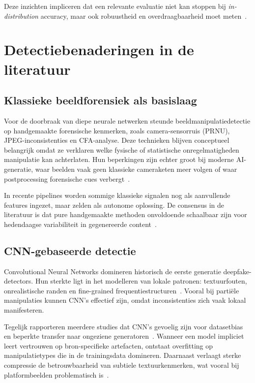 Deze inzichten impliceren dat een relevante evaluatie niet kan stoppen bij \emph{in-distribution} accuracy, maar ook robuustheid en overdraagbaarheid moet meten~\autocite{EvaluationModels2025,OpenSet2025}.

\section{Detectiebenaderingen in de literatuur}

\subsection{Klassieke beeldforensiek als basislaag}
Voor de doorbraak van diepe neurale netwerken steunde beeldmanipulatiedetectie op handgemaakte forensische kenmerken, zoals camera-sensorruis (PRNU), JPEG-inconsistenties en CFA-analyse. Deze technieken blijven conceptueel belangrijk omdat ze verklaren welke fysische of statistische onregelmatigheden manipulatie kan achterlaten. Hun beperkingen zijn echter groot bij moderne AI-generatie, waar beelden vaak geen klassieke cameraketen meer volgen of waar postprocessing forensische cues verbergt~\autocite{Pei2024}.

In recente pipelines worden sommige klassieke signalen nog als aanvullende features ingezet, maar zelden als autonome oplossing. De consensus in de literatuur is dat pure handgemaakte methoden onvoldoende schaalbaar zijn voor hedendaagse variabiliteit in gegenereerde content~\autocite{Raza2026}.

\subsection{CNN-gebaseerde detectie}
Convolutional Neural Networks domineren historisch de eerste generatie deepfake-detectors. Hun sterkte ligt in het modelleren van lokale patronen: textuurfouten, onrealistische randen en fine-grained frequentiestructuren~\autocite{Raza2026}. Vooral bij partiële manipulaties kunnen CNN's effectief zijn, omdat inconsistenties zich vaak lokaal manifesteren.

Tegelijk rapporteren meerdere studies dat CNN's gevoelig zijn voor datasetbias en beperkte transfer naar ongeziene generatoren~\autocite{Pei2024,EvaluationModels2025}. Wanneer een model impliciet leert vertrouwen op bron-specifieke artefacten, ontstaat overfitting op manipulatietypes die in de trainingsdata domineren. Daarnaast verlaagt sterke compressie de betrouwbaarheid van subtiele textuurkenmerken, wat vooral bij platformbeelden problematisch is~\autocite{CompressionHybrid2025}.

